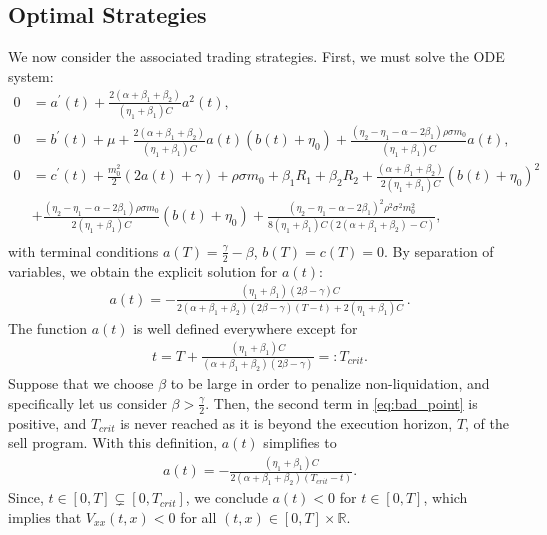 \documentclass[12pt, letterpaper]{article}
\def\R{{\mathbb R}}        %
\numberwithin{equation}{section}
\numberwithin{theorem}{section}
\begin{document}
\subsection{Optimal Strategies}\label{sec:cons_strats}
We now consider the associated trading strategies. First, we must solve the ODE system:
\begin{equation}
\begin{aligned}
0&=a^\prime(t)+\frac{2(\alpha+\beta_1+\beta_2)}{(\eta_1+\beta_1)C}a^2(t),\\
0&=b^\prime(t)+\mu+\frac{2(\alpha+\beta_1+\beta_2)}{(\eta_1+\beta_1)C}a(t)(b(t)+\eta_0)+\frac{(\eta_2-\eta_1-\alpha-2\beta_1)\rho\sigma m_0}{(\eta_1+\beta_1)C}a(t),\\
0&=c^\prime(t)+\frac{m_0^2}{2}(2a(t)+\gamma)+\rho\sigma m_0+\beta_1R_1+\beta_2R_2+\frac{(\alpha+\beta_1+\beta_2)}{2(\eta_1+\beta_1)C}(b(t)+\eta_0)^2\\
&+\frac{(\eta_2-\eta_1-\alpha-2\beta_1)\rho\sigma m_0}{2(\eta_1+\beta_1)C}(b(t)+\eta_0)+\frac{(\eta_2-\eta_1-\alpha-2\beta_1)^2\rho^2\sigma^2 m_0^2}{8(\eta_1+\beta_1)C(2(\alpha+\beta_1+\beta_2)-C)},\\
\end{aligned}
\end{equation}
with terminal conditions $a(T)=\frac{\gamma}{2}-\beta$, $b(T)=c(T)=0$.  By separation of variables, we obtain the explicit solution for $a(t)$:
\begin{equation*}
\begin{aligned} 
a(t)=-\frac{(\eta_1+\beta_1)\left(2\beta-{\gamma}\right)C}{2(\alpha+\beta_1+\beta_2)\left(2\beta-{\gamma}\right)(T-t)+2(\eta_1+\beta_1)C}\,.
\end{aligned}
\end{equation*}
The function $a(t)$ is well  defined everywhere except for 
\begin{equation}\label{eq:bad_point}
\begin{aligned} 
t=T+\frac{(\eta_1+\beta_1)C}{(\alpha+\beta_1+\beta_2)\left(2\beta-\gamma\right)}=:T_{crit}.
\end{aligned}
\end{equation}
Suppose that we choose  $\beta$ to be  large in order to penalize non-liquidation, and specifically let us consider $\beta>\frac{\gamma}{2}$.  Then, the second term in \eqref{eq:bad_point} is positive, and $T_{crit}$ is never reached as it is beyond the execution horizon, $T$, of the sell program. With this definition, $a(t)$ simplifies to
\begin{equation*}
\begin{aligned} 
a(t)=-\frac{(\eta_1+\beta_1)C}{2(\alpha+\beta_1+\beta_2)\left(T_{crit}-t\right)}.
\end{aligned}
\end{equation*}
Since, $t\in[0,T]\subsetneq[0,T_{crit}]$, we conclude $a(t)<0$ for $t\in[0,T]$, which implies that $V_{xx}(t,x)<0$ for all $(t,x)\in [0,T]\times\R$. 
\end{document}
